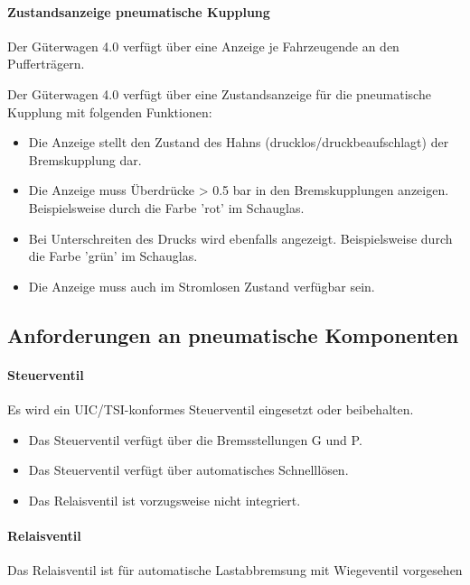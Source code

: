 \paragraph{Zustandsanzeige pneumatische Kupplung}
\begin{feat}
Der Güterwagen 4.0 verfügt über eine Anzeige je Fahrzeugende an den Pufferträgern.
\end{feat}
\begin{feat}
Der Güterwagen 4.0  verfügt über eine Zustandsanzeige für die pneumatische Kupplung mit folgenden Funktionen:
\begin{itemize}
    \item Die Anzeige stellt den Zustand des Hahns (drucklos/druckbeaufschlagt) der Bremskupplung dar.
    \item Die Anzeige muss Überdrücke > 0.5 bar in den Bremskupplungen anzeigen. Beispielsweise durch die Farbe 'rot' im Schauglas.
    \item Bei Unterschreiten des Drucks wird ebenfalls angezeigt. Beispielsweise durch die Farbe 'grün' im Schauglas.
    \item Die Anzeige muss auch im Stromlosen Zustand verfügbar sein.
\end{itemize}
\end{feat}

\subsection{Anforderungen an pneumatische Komponenten}
\paragraph{Steuerventil}
\begin{feat}
Es wird ein UIC/TSI-konformes Steuerventil eingesetzt oder beibehalten.
\begin{itemize}
    \item Das Steuerventil verfügt über die Bremsstellungen G und P.
    \item Das Steuerventil verfügt über automatisches Schnelllösen. 
    \item Das Relaisventil ist vorzugsweise nicht integriert.
\end{itemize}
\end{feat}

\paragraph{Relaisventil}
\begin{feat}
Das Relaisventil ist für automatische Lastabbremsung mit Wiegeventil vorgesehen
\end{feat}

